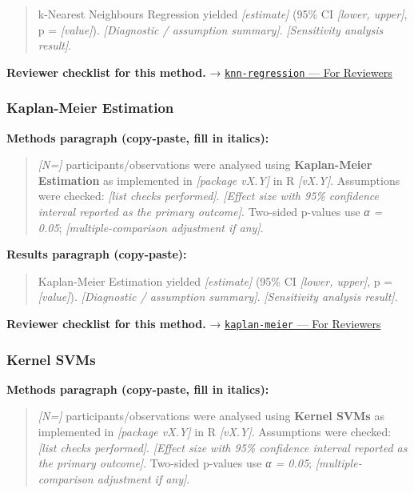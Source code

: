 \documentclass[
]{article}
\begin{document}
\begin{quote}
k-Nearest Neighbours Regression yielded \emph{{[}estimate{]}} (95\% CI
\emph{{[}lower, upper{]}}, p = \emph{{[}value{]}}). \emph{{[}Diagnostic
/ assumption summary{]}}. \emph{{[}Sensitivity analysis result{]}}.
\end{quote}

\textbf{Reviewer checklist for this method.} →
\href{../chapters/13-ml/knn-regression.Rmd\#for-reviewers}{\texttt{knn-regression}
--- For Reviewers}

\subsubsection{Kaplan-Meier Estimation}\label{kaplan-meier-estimation}

\textbf{Methods paragraph (copy-paste, fill in italics):}

\begin{quote}
\emph{{[}N={]}} participants/observations were analysed using
\textbf{Kaplan-Meier Estimation} as implemented in \emph{{[}package
vX.Y{]}} in R \emph{{[}vX.Y{]}}. Assumptions were checked: \emph{{[}list
checks performed{]}}. \emph{{[}Effect size with 95\% confidence interval
reported as the primary outcome{]}}. Two-sided p-values use \emph{α =
0.05}; \emph{{[}multiple-comparison adjustment if any{]}}.
\end{quote}

\textbf{Results paragraph (copy-paste):}

\begin{quote}
Kaplan-Meier Estimation yielded \emph{{[}estimate{]}} (95\% CI
\emph{{[}lower, upper{]}}, p = \emph{{[}value{]}}). \emph{{[}Diagnostic
/ assumption summary{]}}. \emph{{[}Sensitivity analysis result{]}}.
\end{quote}

\textbf{Reviewer checklist for this method.} →
\href{../chapters/11-survival/kaplan-meier.Rmd\#for-reviewers}{\texttt{kaplan-meier}
--- For Reviewers}

\subsubsection{Kernel SVMs}\label{kernel-svms}

\textbf{Methods paragraph (copy-paste, fill in italics):}

\begin{quote}
\emph{{[}N={]}} participants/observations were analysed using
\textbf{Kernel SVMs} as implemented in \emph{{[}package vX.Y{]}} in R
\emph{{[}vX.Y{]}}. Assumptions were checked: \emph{{[}list checks
performed{]}}. \emph{{[}Effect size with 95\% confidence interval
reported as the primary outcome{]}}. Two-sided p-values use \emph{α =
0.05}; \emph{{[}multiple-comparison adjustment if any{]}}.
\end{quote}
\end{document}
